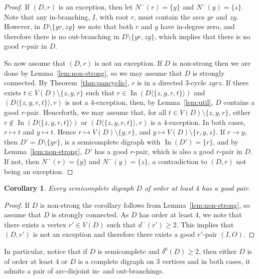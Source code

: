 \documentclass{article}
\newtheorem{corollary}[theorem]{Corollary}
\theoremstyle{definition}
\newcommand{\ra}{\rightarrow}
\DeclareMathOperator{\In}{In}
\newcommand{\2}{\vspace{0.2cm}}
\begin{document}
\begin{proof}
If $(D,r)$ is an exception, then let $N^-(r) = \{y\}$ and $N^-(y) =
\{z\}$.  Note that any in-branching, $I$, with root $r$, must contain
the arcs $yr$ and $zy$.  However, in $D \setminus \{yr,zy\}$ we note
that both $r$ and $y$ have in-degree zero, and therefore there is no
out-branching in $D \setminus \{yr,zy\}$, which implies that there is
no good $r$-pair in $D$.

So now assume that $(D,r)$ is not an exception. If $D$ is non-strong
then we are done by Lemma~\ref{lem:non-strong}, so we may assume that
$D$ is strongly connected.  By Theorem~\ref{thm:pancyclic}, $r$ is in
a directed $3$-cycle $zyrz$.  If there exists $t\in V(D)\setminus
\{z,y,r\}$ such that $r\in \In(D\langle\{z,y,r,t\}\rangle)$ and
$(D\langle\{z,y,r,t\}\rangle, r)$ is not a $4$-exception, then, by
Lemma~\ref{lem:util}, $D$ contains a good $r$-pair.  Henceforth, we
may assume that, for all $t\in V(D)\setminus \{z,y,r\}$, either
$r\notin \In(D\langle\{z,y,r,t\}\rangle)$ or
$(D\langle\{z,y,r,t\}\rangle, r)$ is a $4$-exception.  In both cases,
$r\mapsto t$ and $y\mapsto t$.  Hence $r\mapsto V(D)\setminus
\{y,r\}$, and $y\mapsto V(D)\setminus \{r,y,z\}$.  If $r\ra y$, then
$D'=D\setminus \{yr\}$, is a semicomplete digraph with
$\In(D')=\{r\}$, and by Lemma~\ref{lem:non-strong}, $D'$ has a good
$r$-pair, which is also a good $r$-pair in $D$.  If not, then
$N^-(r)=\{y\}$ and $N^-(y)=\{z\}$, a contradiction to $(D,r)$ not
being an exception.
\end{proof}

\begin{corollary}\label{cor:in+out}
Every semicomplete digraph $D$ of order at least $4$ has a good pair.
\end{corollary}

\begin{proof}
If $D$ is non-strong the corollary follows from
Lemma~\ref{lem:non-strong}, so assume that $D$ is strongly connected.
As $D$ has order at least $4$, we note that there exists a vertex $r' \in
V(D)$ such that $d^-(r') \geq 2$.  This implies that $(D,r')$ is not
an exception and therefore there exists a good $r'$-pair $(I,O)$.
\end{proof}

In particular, notice that if $D$ is semicomplete and $\delta^0(D)\ge
2$, then either $D$ is of order at least $4$ or $D$ is a complete
digraph on $3$ vertices and in both cases, it admits a pair of
arc-disjoint in- and out-branchings.
\end{document}
